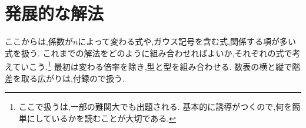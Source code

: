 
\section{発展的な解法}\label{節：発展パターン}
ここからは,係数が$n$によって変わる式や,ガウス記号を含む式,関係する項が多い式を扱う.
これまでの解法をどのように組み合わせればよいか,それぞれの式で考えていこう.\footnote{ここで扱うは,一部の難関大でも出題される.
基本的に誘導がつくので,何を簡単にしているかを読むことが大切である.}
最初は変わる倍率を除き,型と型を組み合わせる.
数表の横と縦で階差を取る広がりは,付録ので扱う.





